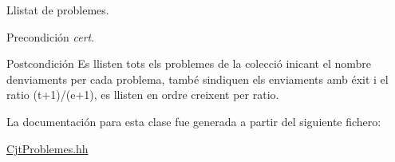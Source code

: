 Llistat de problemes. 

\begin{DoxyPrecond}{Precondición}
{\itshape cert}. 
\end{DoxyPrecond}
\begin{DoxyPostcond}{Postcondición}
Es llisten tots els problemes de la colecció inicant el nombre d\textquotesingle{}enviaments per cada problema, també s\textquotesingle{}indiquen els enviaments amb éxit i el ratio (t+1)/(e+1), es llisten en ordre creixent per ratio. 
\end{DoxyPostcond}


La documentación para esta clase fue generada a partir del siguiente fichero\+:\begin{DoxyCompactItemize}
\item 
\mbox{\hyperlink{_cjt_problemes_8hh}{Cjt\+Problemes.\+hh}}\end{DoxyCompactItemize}
